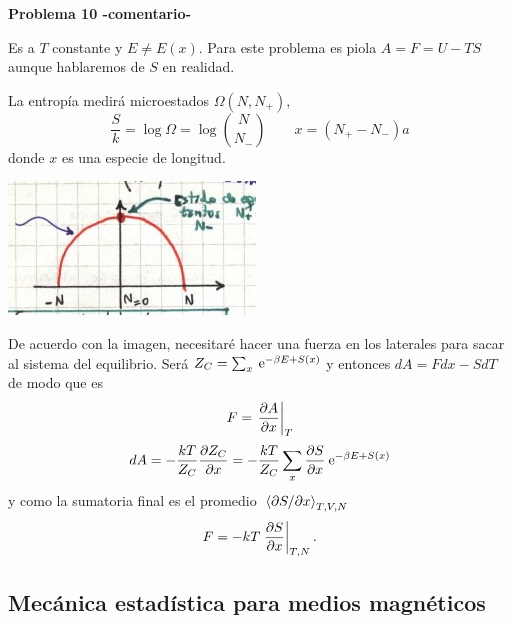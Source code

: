 \documentclass[10pt,oneside]{CBFT_book}
\begin{document}
\begin{ejemplo}{\bf Problema 10 -comentario-}

Es a $T$ constante y $E\neq E(x)$. Para este problema es piola $ A = F = U - TS $ aunque
hablaremos de $S$ en realidad.

La entropía medirá microestados $\Omega(N,N_+)$,
\[
	\frac{S}{k} = \log \Omega = \log \binom{N}{N_-} \qquad 
	x = (N_+ - N_-) a
\]
donde $x$ es una especie de longitud.
 
\includegraphics[scale=0.5]{images/1606329480.jpg} 

De acuerdo con la imagen, necesitaré hacer una fuerza en los laterales para sacar al sistema
del equilibrio.
Será $ Z_C = \sum_x \:\mathrm{e}^{-\beta E + S(x)}$ y entonces $dA = F dx - S dT$ de modo que es
\[
	F = \left.\frac{\partial^{\hspace{-0.05em}} {A}}{\partial {x}^{\hspace{-0.05em}}}\right|_{T}
\]
\[
	dA = - \frac{kT}{Z_C} \frac{\partial^{\hspace{-0.05em}} {Z_C}}{\partial {x}^{\hspace{-0.05em}}} = - \frac{kT}{Z_C} \sum_ x \frac{\partial^{\hspace{-0.05em}} {S}}{\partial {x}^{\hspace{-0.05em}}} \:\mathrm{e}^{-\beta E + S(x)}
\]
y como la sumatoria final es el promedio $\:\left\langle \partial S/\partial x \right\rangle_{T,V,N}$
\[
	F = - k T \left.\frac{\partial^{\hspace{-0.05em}} {S}}{\partial {x}^{\hspace{-0.05em}}}\right|_{T,N}.
\]
 
\end{ejemplo}


\subsection{Mecánica estadística para medios magnéticos}
\end{document}
